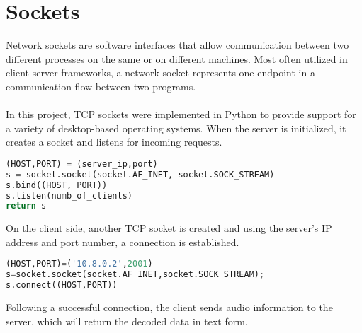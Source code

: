 \section{Sockets}
Network sockets are software interfaces that allow communication between two different processes on the same or on different machines.
Most often utilized in client-server frameworks, a network socket represents one endpoint in a communication flow between two programs.\\\\
In this project, TCP sockets were implemented in Python to provide support for a variety of desktop-based operating systems.
When the server is initialized, it creates a socket and listens for incoming requests.
\begin{lstlisting}[language=Python, flexiblecolumns=true, caption=Server initialization.]
(HOST,PORT) = (server_ip,port)
s = socket.socket(socket.AF_INET, socket.SOCK_STREAM)
s.bind((HOST, PORT))
s.listen(numb_of_clients)
return s
\end{lstlisting}
On the client side, another TCP socket is created and using the server's IP address and port number, a connection is established. 
\begin{lstlisting}[language=Python, flexiblecolumns=true, caption=Client initialization.]
(HOST,PORT)=('10.8.0.2',2001)
s=socket.socket(socket.AF_INET,socket.SOCK_STREAM);
s.connect((HOST,PORT))
\end{lstlisting}
Following a successful connection, the client sends audio information to the server, which will return the decoded data in text form. 